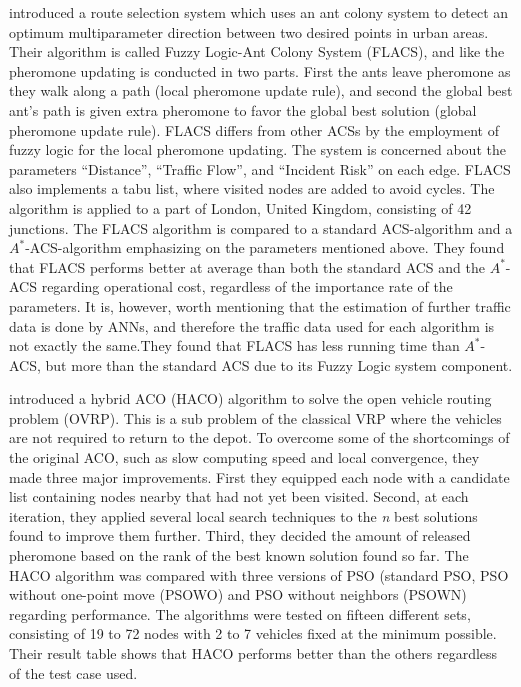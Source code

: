 \citet{salehinejad10} introduced a route selection system which uses an ant colony system to detect an optimum multiparameter direction between two desired points in urban areas. Their algorithm is called Fuzzy Logic-Ant Colony System (FLACS), and like \citet{tripathi09} the pheromone updating is conducted in two parts. First the ants leave pheromone as they walk along a path (local pheromone update rule), and second the global best ant's path is given extra pheromone to favor the global best solution (global pheromone update rule). FLACS differs from other ACSs by the employment of fuzzy logic for the local pheromone updating. The system is concerned about the parameters ``Distance'', ``Traffic Flow'', and ``Incident Risk'' on each edge. FLACS also implements a tabu list, where visited nodes are added to avoid cycles. The algorithm is applied to a part of London, United Kingdom, consisting of 42 junctions. The FLACS algorithm is compared to a standard ACS-algorithm and a $A^*$-ACS-algorithm emphasizing on the parameters mentioned above. They found that FLACS performs better at average than both the standard ACS and the $A^*$-ACS regarding operational cost, regardless of the importance rate of the parameters. It is, however, worth mentioning that the estimation of further traffic data is done by ANNs, and therefore the traffic data used for each algorithm is not exactly the same.They found that FLACS has less running time than $A^*$-ACS, but more than the standard ACS due to its Fuzzy Logic system component. 

\citet{sedighpour14} introduced a hybrid ACO (HACO) algorithm to solve the open vehicle routing problem (OVRP). This is a sub problem of the classical VRP where the vehicles are not required to return to the depot. To overcome some of the shortcomings of the original ACO, such as slow computing speed and local convergence, they made three major improvements. First they equipped each node with a candidate list containing nodes nearby that had not yet been visited. Second, at each iteration, they applied several local search techniques to the \textit{n} best solutions found to improve them further. Third, they decided the amount of released pheromone based on the rank of the best known solution found so far. The HACO algorithm was compared with three versions of PSO (standard PSO, PSO without one-point move (PSOWO) and PSO without neighbors (PSOWN) regarding performance. The algorithms were tested on fifteen different sets, consisting of 19 to 72 nodes with 2 to 7 vehicles fixed at the minimum possible. Their result table shows that HACO performs better than the others regardless of the test case used.
\newline

